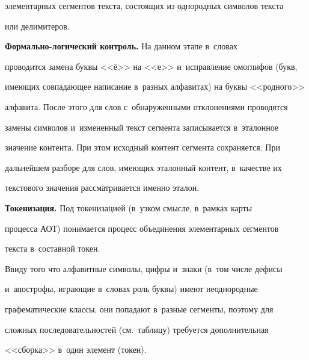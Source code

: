 элементарных сегментов текста, состоящих из однородных символов текста 


или делимитеров.


  


  \textbf{Формально-логический контроль.} На данном этапе в~словах 


проводится замена буквы <<ё>> на <<е>> и~исправление омоглифов (букв, 


имеющих совпадающее написание в~разных алфавитах) на буквы <<родного>> 


алфавита. После этого для слов с~обнаруженными отклонениями проводятся 


замены символов и~измененный текст сегмента записывается в~эталонное 


значение контента. При этом исходный контент сегмента сохраняется. При 


дальнейшем разборе для слов, имеющих эталонный контент, в~качестве их 


текстового значения рассматривается именно эталон.


  


  \textbf{Токенизация.} Под токенизацией (в~узком смысле, в~рамках карты 


процесса АОТ) понимается процесс объединения элементарных сегментов 


текста в~составной токен.


  


  Ввиду того что алфавитные символы, цифры и~знаки (в~том числе дефисы 


и~апострофы, играющие в~словах роль буквы) имеют неоднородные 


графематические классы, они попадают в~разные сегменты, поэтому для 


сложных последовательностей (см.\ таблицу) требуется дополнительная 


<<сборка>> в~один элемент (токен).


